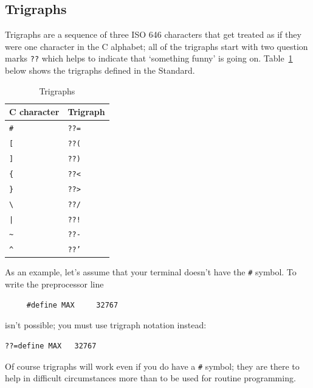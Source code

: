   

  \subsection{Trigraphs}
   

   Trigraphs are a sequence of three ISO 646 characters that get
    treated as if they were one character in the C alphabet; all of the
    trigraphs start with two question marks \texttt{??} which helps
    to indicate that `something funny' is going on.
    Table~\ref{tab:trigraphs} below shows the trigraphs defined in the Standard.


    \begin{table}[htb]
      \centering
      \begin{tabular}{ll}
        \toprule
        C character & Trigraph    \\
        \midrule
        \texttt{\#} & \texttt{??=}    \\
        \texttt{[}  & \texttt{??(}    \\
        \texttt{]}  & \texttt{??)}    \\
        \texttt{\{} & \texttt{??<}    \\
        \texttt{\}} & \texttt{??>}    \\
        \texttt{\textbackslash} & \texttt{??/}    \\
        \texttt{|}  & \texttt{??!}    \\
        \texttt{\~} & \texttt{??-}    \\
        \texttt{\^} & \texttt{??'}    \\
        \bottomrule
      \end{tabular}
      \caption{\label{tab:trigraphs}Trigraphs}
    \end{table}


   As an example, let's assume that your terminal doesn't have the
    \texttt{\#} symbol. To write the preprocessor line


   \begin{Verbatim}
     #define MAX     32767
   \end{Verbatim}

   isn't possible; you must use trigraph notation instead:


   \begin{Verbatim}
??=define MAX   32767
\end{Verbatim}

   Of course trigraphs will work even if you do have a
    \texttt{\#} symbol; they are there to help in difficult
    circumstances more than to be used for routine programming.


